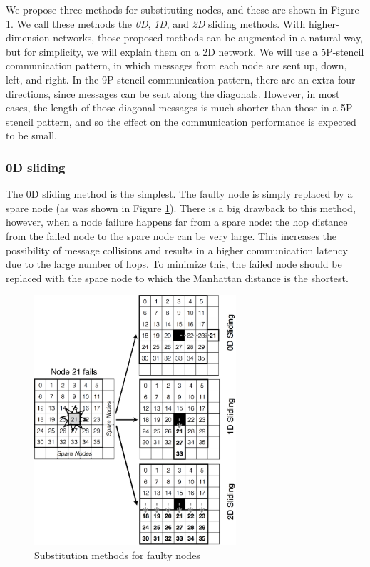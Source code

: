 \documentclass[Afour,times,sagev]{sagej}
\begin{document}
We propose three methods for substituting nodes, and these are shown
in Figure \ref{fig:node-substitution}. We call these methods the {\it
  0D}, {\it 1D}, and {\it 2D} sliding methods. With higher-dimension
networks, those proposed methods can be augmented in a natural way,
but for simplicity, we will explain them on a 2D network. We will use
a 5P-stencil communication pattern, in which messages from each node
are sent up, down, left, and right. In the 9P-stencil communication
pattern, there are an extra four directions, since messages can be
sent along the diagonals. However, in most cases, the length of those
diagonal messages is much shorter than those in a 5P-stencil pattern,
and so the effect on the communication performance is expected to be
small.

\subsubsection{0D sliding}\label{sec:0d-sliding}

The 0D sliding method is the simplest. The faulty node is simply
replaced by a spare node (as was shown in Figure
\ref{fig:node-substitution}). There is a big drawback to this method,
however, when a node failure happens far from a spare node: the hop
distance from the failed node to the spare node can be very
large. This increases the possibility of message collisions and
results in a higher communication latency due to the large number of
hops. To minimize this, the failed node should be replaced with the
spare node to which the Manhattan distance is the shortest.

\begin{figure}[ht]
\centering
\includegraphics[width=75mm]{Figs/SpareNode.eps}
  \caption{Substitution methods for faulty nodes}
  \label{fig:node-substitution}
\end{figure}
\end{document}
